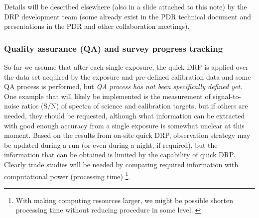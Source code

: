 \documentclass[a4paper,notitlepage]{article}
\begin{document}
Details will be described elsewhere (also in a slide attached to this note) 
by the DRP development team (some
already exist in the PDR technical document and presentations in the PDR
and other collaboration meetings).


\subsubsection{Quality assurance (QA) and survey progress tracking}
\label{sec:qa}

So far we assume that after each single exposure, the quick DRP is
applied 
over the data set acquired by the exposure and pre-defined calibration data 
and some QA process is performed, but {\it QA process has not
been specifically defined yet.}  One example that will likely be
implemented is the measurement of signal-to-noise ratios (S/N) of
spectra of science and calibration targets, but if others are needed,
they should be requested, although what information can be extracted
with good enough accuracy from a single exposure is somewhat unclear at
this moment. Based on the results from on-site quick DRP, observation
strategy may be updated during a run (or even during a night, if
required), but the information that can be obtained is limited by the
capability of quick DRP. Clearly trade studies will be needed by
comparing required information with computational power (processing
time) \footnote{With making computing resources larger, we might be
possible shorten processing time without reducing procedure in some
level..}.
\end{document}
